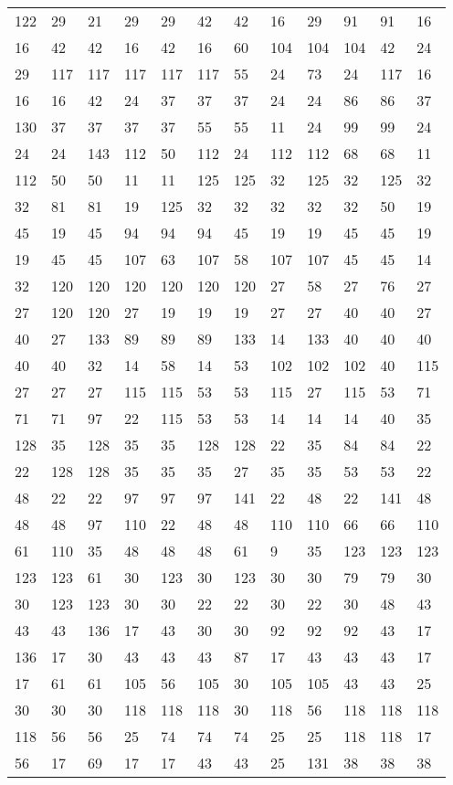 \begin{longtable}{llllllllllll}
122 &29& 21 &29 &29& 42&42 &16& 29 &91 &91& 16\\
16 &42& 42 &16 &42& 16&60 &104& 104 &104 &42& 24\\
29 &117& 117 &117 &117& 117&55 &24& 73 &24 &117& 16\\
16 &16& 42 &24 &37& 37&37 &24& 24 &86 &86& 37\\
130 &37& 37 &37 &37& 55&55 &11& 24 &99 &99& 24\\
24 &24& 143 &112 &50& 112&24 &112& 112 &68 &68& 11\\
112 &50& 50 &11 &11& 125&125 &32& 125 &32 &125& 32\\
32 &81& 81 &19 &125& 32&32 &32& 32 &32 &50& 19\\
45 &19& 45 &94 &94& 94&45 &19& 19 &45 &45& 19\\
19 &45& 45 &107 &63& 107&58 &107& 107 &45 &45& 14\\
32 &120& 120 &120 &120& 120&120 &27& 58 &27 &76& 27\\
27 &120& 120 &27 &19& 19&19 &27& 27 &40 &40& 27\\
40 &27& 133 &89 &89& 89&133 &14& 133 &40 &40& 40\\
40 &40& 32 &14 &58& 14&53 &102& 102 &102 &40& 115\\
27 &27& 27 &115 &115& 53&53 &115& 27 &115 &53& 71\\
71 &71& 97 &22 &115& 53&53 &14& 14 &14 &40& 35\\
128 &35& 128 &35 &35& 128&128 &22& 35 &84 &84& 22\\
22 &128& 128 &35 &35& 35&27 &35& 35 &53 &53& 22\\
48 &22& 22 &97 &97& 97&141 &22& 48 &22 &141& 48\\
48 &48& 97 &110 &22& 48&48 &110& 110 &66 &66& 110\\
61 &110& 35 &48 &48& 48&61 &9& 35 &123 &123& 123\\
123 &123& 61 &30 &123& 30&123 &30& 30 &79 &79& 30\\
30 &123& 123 &30 &30& 22&22 &30& 22 &30 &48& 43\\
43 &43& 136 &17 &43& 30&30 &92& 92 &92 &43& 17\\
136 &17& 30 &43 &43& 43&87 &17& 43 &43 &43& 17\\
17 &61& 61 &105 &56& 105&30 &105& 105 &43 &43& 25\\
30 &30& 30 &118 &118& 118&30 &118& 56 &118 &118& 118\\
118 &56& 56 &25 &74& 74&74 &25& 25 &118 &118& 17\\
56 &17& 69 &17 &17& 43&43 &25& 131 &38 &38& 38\\

\end{longtable}
